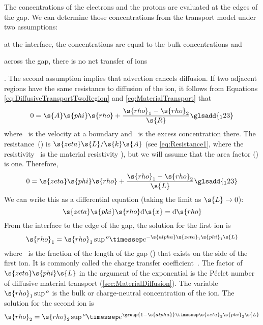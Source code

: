 The concentrations of the electrons and the protons are evaluated at the edges of the gap.  We can determine those concentrations from the transport model under two assumptions: \begin{inparaenum}[(1)]\item at the interface, the concentrations are equal to the bulk concentrations and \item across the gap, there is no net transfer of ions\end{inparaenum}.  The second assumption implies that advection cancels diffusion.  If two adjacent regions have the same resistance to diffusion of the ion, it follows from Equations \ref{eq:DiffusiveTransportTwoRegion} and \ref{eq:MaterialTransport} that
\begin{equation}
  0 = \s{A}\s{phi}\s{rho} + \frac{\s{rho}_1 - \s{rho}_2}{\s{R}}
  \glsadd{_123}
\end{equation}
where ~is the velocity at a boundary and ~is the excess concentration there.  The resistance~() is $\s{zeta}\s{L}/\s{k}\s{A}$ (see \autoref{eq:Resistance1}, where the resistivity ~is the material resistivity ), but we will assume that the area factor () is one. Therefore,
\begin{equation}
  0 = \s{zeta}\s{phi}\s{rho} + \frac{\s{rho}_1 - \s{rho}_2}{\s{L}}
  \glsadd{_123}
\end{equation}
We can write this as a differential equation (taking the limit as $\s{L} \to 0$):
\begin{equation}
  \s{zeta}\s{phi}\s{rho}\mathrm{d}\s{x} = \mathrm{d}\s{rho}
\end{equation}
From the interface to the edge of the gap, the solution for the first ion is
\begin{equation}
  \s{rho}_1 = \s{rho}_1\sup{^o}\timessep e^{-\s{alpha}\s{zeta}_1\s{phi}_1\s{L}}
\end{equation}
where ~is the fraction of the length of the gap () that exists on the side of the first ion.  It is commonly called the charge transfer coefficient~\cite{Bockris1973}.  The factor of $\s{zeta}\s{phi}\s{L}$ in the argument of the exponential is the P\'eclet number of diffusive material transport (\autoref{sec:MaterialDiffusion}). The variable $\s{rho}_1\sup{^o}$ is the bulk or charge-neutral concentration of the ion.  The solution for the second ion is
\begin{equation}
  \s{rho}_2 = \s{rho}_2\sup{^o}\timessep e^{\group{1 - \s{alpha}}\timessep\s{zeta}_2\s{phi}_2\s{L}}
\end{equation}
